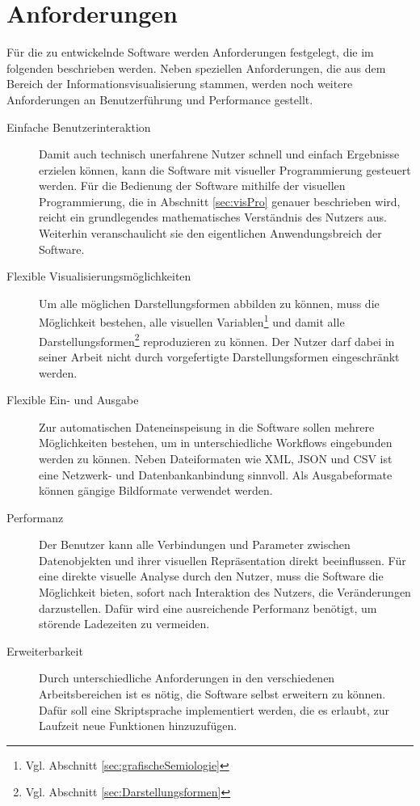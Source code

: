 \documentclass[a4paper, 
               12pt,
               DIV=calc,
               version=first,
               pdftex,
               headsepline,
               footsepline,
               bibtotocnumbered,
               liststotocnumbered]{scrreprt}
\begin{document}
\section{Anforderungen}
\label{sec:Anforderungen}
Für die zu entwickelnde Software werden Anforderungen festgelegt, die
im folgenden beschrieben werden. Neben speziellen Anforderungen, die aus
dem Bereich der Informationsvisualisierung stammen, werden noch weitere
Anforderungen an Benutzerführung und Performance gestellt.
\begin{description}
\item[Einfache Benutzerinteraktion]
Damit auch technisch unerfahrene Nutzer schnell und einfach Ergebnisse erzielen können, kann die Software
mit visueller Programmierung gesteuert werden. Für die Bedienung der Software mithilfe der visuellen
Programmierung, die in Abschnitt \ref{sec:visPro} genauer beschrieben wird,
reicht ein grundlegendes mathematisches Verständnis des Nutzers aus.
Weiterhin veranschaulicht sie den eigentlichen Anwendungsbreich der Software.
\item[Flexible Visualisierungsmöglichkeiten]
Um alle möglichen Darstellungsformen abbilden zu können, muss die 
Möglichkeit bestehen, alle visuellen Variablen\footnote{Vgl. Abschnitt
\ref{sec:grafischeSemiologie}} und damit alle Darstellungsformen\footnote{Vgl. Abschnitt
\ref{sec:Darstellungsformen}} reproduzieren zu können. Der Nutzer darf dabei
in seiner Arbeit nicht durch vorgefertigte Darstellungsformen
eingeschränkt werden.
\item[Flexible Ein- und Ausgabe]
Zur automatischen Dateneinspeisung in die Software sollen mehrere Möglichkeiten
bestehen, um in unterschiedliche Workflows eingebunden werden zu können.
Neben Dateiformaten wie XML, JSON und CSV ist eine Netzwerk- und
Datenbankanbindung sinnvoll. Als Ausgabeformate können gängige Bildformate
verwendet werden.
\item[Performanz]
Der Benutzer kann alle Verbindungen und Parameter zwischen Datenobjekten und ihrer
visuellen Repräsentation direkt beeinflussen. Für eine direkte visuelle Analyse
durch den Nutzer, muss die Software die Möglichkeit bieten, sofort
nach Interaktion des Nutzers, die Veränderungen darzustellen. Dafür wird eine
ausreichende Performanz benötigt, um störende Ladezeiten zu vermeiden.
\item[Erweiterbarkeit]
Durch unterschiedliche Anforderungen in den verschiedenen Arbeitsbereichen ist
es nötig, die Software selbst erweitern zu können. Dafür soll eine Skriptsprache
implementiert werden, die es erlaubt, zur Laufzeit neue Funktionen hinzuzufügen.

\end{description}
\end{document}
